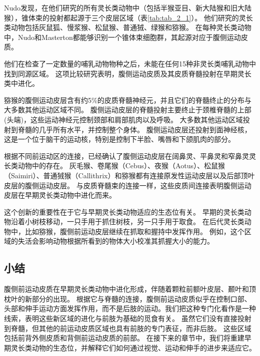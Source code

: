 Nudo\cite{nudo1988descending,nudo1990descending}发现，在他们研究的所有灵长类动物中（包括半猴亚目、新大陆猴和旧大陆猴），锥体束的投射都起源于三个皮层区域（表\ref{tab:tab_2_1}）。
他们研究的灵长类动物包括灰鼠狐、慢浆猴、松鼠猴、普通狨、绿猴和猕猴。
在每种灵长类动物中，Nudo和Masterton都能够识别一个锥体束细胞群，其起源对应于腹侧运动皮质。


他们在检查了一定数量的哺乳动物物种之后，未能在任何15种非灵长类哺乳动物中找到同源区域。
这项比较研究表明，腹侧运动皮质及其皮质脊髓投射在早期灵长类中进化。


猕猴的腹侧运动皮层含有约5\%的皮质脊髓神经元\cite{dum2004motor}，并且它们的脊髓终止的分布与大多数其他运动区域不同。
腹侧运动皮层的脊髓投射主要终止于颈椎脊髓的上部(头端)，这些运动神经元控制颈部和肩部肌肉以及呼吸。
大多数其他运动区域投射到脊髓的几乎所有水平，并控制整个身体。
腹侧运动皮层还投射到面神经核，这是一个位于脑干的运动核，特别是控制下半脸、嘴唇和下颌肌肉的部分\cite{morecraft2001cortical}。


根据不同前运动区的连接，已经确认了腹侧运动皮层在阔鼻灵、平鼻灵和窄鼻灵灵长类动物中的存在\cite{kaas2004evolution}。
灰毛猴、卷尾猴（Cebus）\cite{dum2004motor}、夜猴（Aotus）\cite{preuss1996movement,gharbawie2010thalamocortical}、松鼠猴（Saimiri）\cite{cowey1968varying}、普通狨猴（Callithrix）\cite{burish2008microstimulation}和猕猴\cite{lu1994interconnections}都有连接原发性运动皮层以及后部顶叶皮层的腹侧运动皮层。
与皮质脊髓束的连接一样，这些皮质间连接表明腹侧运动皮层在早期灵长类动物中进化而来。


这个创新的重要性在于它与早期灵长类动物适应的生态位有关。
早期的灵长类动物沿着小树枝移动，一只手用于抓住树枝，另一只手用于取食。
在后代灵长类动物中，比如猕猴，腹侧前运动皮层继续在抓取和握持中发挥作用。
例如，这个区域的失活会影响动物根据所看到的物体大小校准其抓握大小的能力\cite{fogassi2001cortical}。



\subsection{小结}
腹侧前运动皮质在早期灵长类动物中进化形成，伴随着颗粒前额叶皮层、颞叶和顶枕叶的新部分的出现。
根据它与脊髓的连接，腹侧前运动皮质似乎在控制口部、头部和伸手运动方面发挥作用，而不是后肢的运动。我们把这种专门化看作是一种线索，表明这些新区域的进化与前肢为基础的觅食有关。
虽然它们没有直接投射到脊髓，但其他的前运动皮质区域也具有前肢的专门表征，而非后肢。
这些区域包括前背外侧皮质和背侧前运动皮质的前部。
在接下来的章节中，我们将重建早期灵长类动物的生态位，并解释它们如何通过视觉、运动和伸手的进步来适应它。




